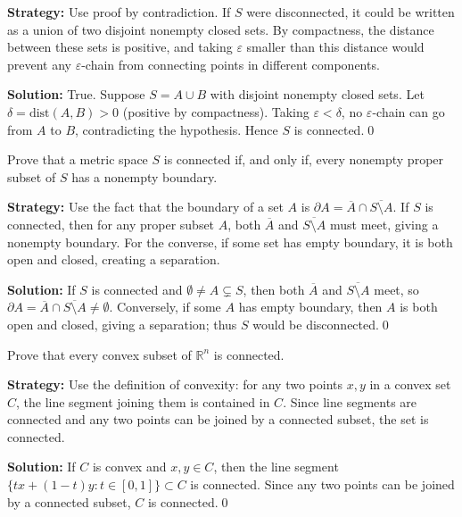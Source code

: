 \noindent\textbf{Strategy:} Use proof by contradiction. If $S$ were disconnected, it could be written as a union of two disjoint nonempty closed sets. By compactness, the distance between these sets is positive, and taking $\varepsilon$ smaller than this distance would prevent any $\varepsilon$-chain from connecting points in different components.

\bigskip\noindent\textbf{Solution:}
True. Suppose $S=A\cup B$ with disjoint nonempty closed sets. Let $\delta=\mathrm{dist}(A,B)>0$ (positive by compactness). Taking $\varepsilon<\delta$, no $\varepsilon$-chain can go from $A$ to $B$, contradicting the hypothesis. Hence $S$ is connected.\qed



\begin{problembox}
Prove that a metric space $S$ is connected if, and only if, every nonempty proper subset of $S$ has a nonempty boundary.
\end{problembox}

\noindent\textbf{Strategy:} Use the fact that the boundary of a set $A$ is $\partial A = \overline{A} \cap \overline{S \setminus A}$. If $S$ is connected, then for any proper subset $A$, both $\overline{A}$ and $\overline{S \setminus A}$ must meet, giving a nonempty boundary. For the converse, if some set has empty boundary, it is both open and closed, creating a separation.

\bigskip\noindent\textbf{Solution:}
If $S$ is connected and $\emptyset\ne A\subsetneq S$, then both $\overline{A}$ and $\overline{S\setminus A}$ meet, so $\partial A=\overline{A}\cap\overline{S\setminus A}\ne\emptyset$. Conversely, if some $A$ has empty boundary, then $A$ is both open and closed, giving a separation; thus $S$ would be disconnected.\qed



\begin{problembox}
Prove that every convex subset of $\mathbb{R}^n$ is connected.
\end{problembox}

\noindent\textbf{Strategy:} Use the definition of convexity: for any two points $x, y$ in a convex set $C$, the line segment joining them is contained in $C$. Since line segments are connected and any two points can be joined by a connected subset, the set is connected.

\bigskip\noindent\textbf{Solution:}
If $C$ is convex and $x,y\in C$, then the line segment $\{tx+(1-t)y: t\in[0,1]\}\subset C$ is connected. Since any two points can be joined by a connected subset, $C$ is connected.\qed



